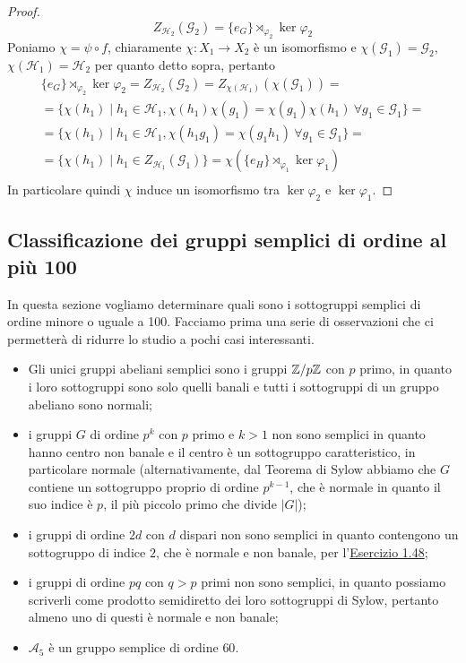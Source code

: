 \documentclass[11pt]{scrartcl}
\begin{document}
\begin{proof}
    \[
        Z_{\mathcal{H}_2}(\mathcal{G}_2) = \{e_G\}\rtimes_{\varphi_2}\ker\varphi_2
    \]
    Poniamo $\chi = \psi\circ f$, chiaramente $\chi: X_1\longrightarrow X_2$
    è un isomorfismo e $\chi(\mathcal{G}_1) = \mathcal{G}_2$, $\chi(\mathcal{H}_1)
    = \mathcal{H}_2$ per quanto detto sopra, pertanto
    \begin{multline*}
        \{e_G\}\rtimes_{\varphi_2}\ker\varphi_2 = Z_{\mathcal{H}_2}(\mathcal{G}_2) =
        Z_{\chi(\mathcal{H}_1)}(\chi(\mathcal{G}_1)) = \\
        = \{\chi(h_1) \mid h_1 \in \mathcal{H}_1, \chi(h_1)\chi(g_1) = 
        \chi(g_1)\chi(h_1)~\forall g_1 \in \mathcal{G}_1\} = \\
        = \{\chi(h_1)\mid h_1 \in \mathcal{H}_1, \chi(h_1g_1) = \chi(g_1h_1)
        ~\forall g_1 \in \mathcal{G}_1\} = \\
        = \{\chi(h_1) \mid h_1 \in Z_{\mathcal{H}_1}(\mathcal{G}_1)\} = 
        \chi(\{e_H\}\rtimes_{\varphi_1}\ker\varphi_1)\\
    \end{multline*}
    In particolare quindi $\chi$ induce un isomorfismo tra $\ker\varphi_2$ e 
    $\ker\varphi_1$.
\end{proof}

\newpage

\subsection{Classificazione dei gruppi semplici di ordine al più 100}

In questa sezione vogliamo determinare quali sono i sottogruppi semplici di 
ordine minore o uguale a 100. Facciamo prima una serie di osservazioni che 
ci permetterà di ridurre lo studio a pochi casi interessanti.

\begin{itemize}
    \item Gli unici gruppi abeliani semplici sono i gruppi ${\mathbb Z}/p{\mathbb Z}$ con $p$ primo,
    in quanto i loro sottogruppi sono solo quelli banali e tutti i sottogruppi
    di un gruppo abeliano sono normali;
    \item i gruppi $G$ di ordine $p^k$ con $p$ primo e $k > 1$ non sono semplici
    in quanto hanno centro non banale e il centro è un sottogruppo caratteristico,
    in particolare normale (alternativamente, dal Teorema di Sylow abbiamo che 
    $G$ contiene un sottogruppo proprio di ordine $p^{k - 1}$, che è normale in quanto
    il suo indice è $p$, il più piccolo primo che divide $|G|$);
    \item i gruppi di ordine $2d$ con $d$ dispari non sono semplici in quanto
    contengono un sottogruppo di indice $2$, che è normale e non banale, per 
    l'\hyperref[ex1.48]{Esercizio 1.48};
    \item i gruppi di ordine $pq$ con $q > p$ primi non sono semplici, in
    quanto possiamo scriverli come prodotto semidiretto dei loro sottogruppi
    di Sylow, pertanto almeno uno di questi è normale e non banale;
    \item $\mathcal{A}_5$ è un gruppo semplice di ordine $60$.
\end{itemize}
\end{document}
